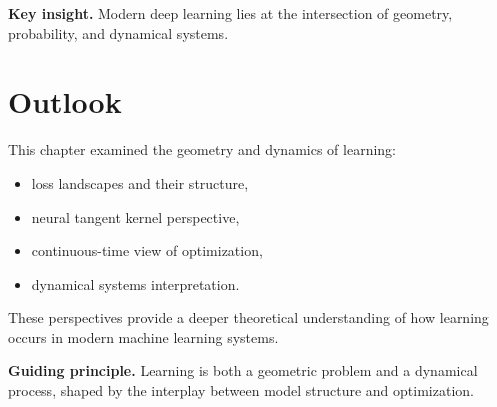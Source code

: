 \medskip

\noindent
\textbf{Key insight.}  
Modern deep learning lies at the intersection of geometry, probability, and dynamical systems.

\section{Outlook}

This chapter examined the geometry and dynamics of learning:
\begin{itemize}
    \item loss landscapes and their structure,
    \item neural tangent kernel perspective,
    \item continuous-time view of optimization,
    \item dynamical systems interpretation.
\end{itemize}

\medskip

These perspectives provide a deeper theoretical understanding of how learning occurs in modern machine learning systems.

\medskip

\noindent
\textbf{Guiding principle.}  
Learning is both a geometric problem and a dynamical process, shaped by the interplay between model structure and optimization.